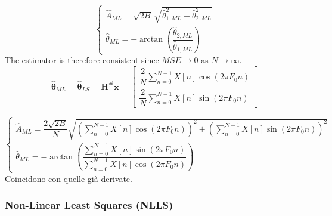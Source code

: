 \begin{itemize}
\[
\begin{cases}
\hat{A}_{ML}
= \sqrt{2B}\,\sqrt{\hat{\theta}_{1,ML}^{2} + \hat{\theta}_{2,ML}^{2}} \\[6pt]
\hat{\theta}_{ML}
= -\arctan\!\left(\dfrac{\hat{\theta}_{2,ML}}{\hat{\theta}_{1,ML}}\right)
\end{cases}
\]
The estimator is therefore consistent since \(MSE \to 0\) as \(N \to \infty\).
\[
\hat{\boldsymbol{\theta}}_{ML}
= \hat{\boldsymbol{\theta}}_{LS}
= \mathbf{H}^{\#}\mathbf{x}
=
\begin{bmatrix}
\dfrac{2}{N}\displaystyle\sum_{n=0}^{N-1} X[n]\cos(2\pi F_{0} n) \\[8pt]
\dfrac{2}{N}\displaystyle\sum_{n=0}^{N-1} X[n]\sin(2\pi F_{0} n)
\end{bmatrix}
\]

\[
\begin{cases}
\displaystyle
\hat{A}_{ML}
= \dfrac{2\sqrt{2B}}{N}
\sqrt{
\left(\displaystyle\sum_{n=0}^{N-1} X[n]\cos(2\pi F_{0} n)\right)^{2}
+
\left(\displaystyle\sum_{n=0}^{N-1} X[n]\sin(2\pi F_{0} n)\right)^{2}
} \\[14pt]
\displaystyle
\hat{\theta}_{ML}
= -\arctan\!\left(
\dfrac{\displaystyle\sum_{n=0}^{N-1} X[n]\sin(2\pi F_{0} n)}
      {\displaystyle\sum_{n=0}^{N-1} X[n]\cos(2\pi F_{0} n)}
\right)
\end{cases}
\]
Coincidono con quelle già derivate.
\end{itemize}
\subsubsection{Non-Linear Least Squares (NLLS)}

